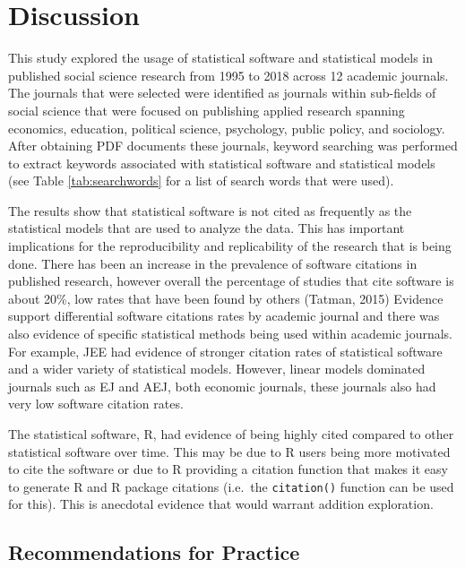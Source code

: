 \documentclass[english,,man]{apa6}
\begin{document}
\hypertarget{discussion}{%
\section{Discussion}\label{discussion}}

This study explored the usage of statistical software and statistical models in published social science research from 1995 to 2018 across 12 academic journals. The journals that were selected were identified as journals within sub-fields of social science that were focused on publishing applied research spanning economics, education, political science, psychology, public policy, and sociology. After obtaining PDF documents these journals, keyword searching was performed to extract keywords associated with statistical software and statistical models (see Table \ref{tab:searchwords} for a list of search words that were used).

The results show that statistical software is not cited as frequently as the statistical models that are used to analyze the data. This has important implications for the reproducibility and replicability of the research that is being done. There has been an increase in the prevalence of software citations in published research, however overall the percentage of studies that cite software is about 20\%, low rates that have been found by others (Tatman, 2015) Evidence support differential software citations rates by academic journal and there was also evidence of specific statistical methods being used within academic journals. For example, JEE had evidence of stronger citation rates of statistical software and a wider variety of statistical models. However, linear models dominated journals such as EJ and AEJ, both economic journals, these journals also had very low software citation rates.

The statistical software, R, had evidence of being highly cited compared to other statistical software over time. This may be due to R users being more motivated to cite the software or due to R providing a citation function that makes it easy to generate R and R package citations (i.e.~the \texttt{citation()} function can be used for this). This is anecdotal evidence that would warrant addition exploration.

\hypertarget{recommendations-for-practice}{%
\subsection{Recommendations for Practice}\label{recommendations-for-practice}}
\end{document}
